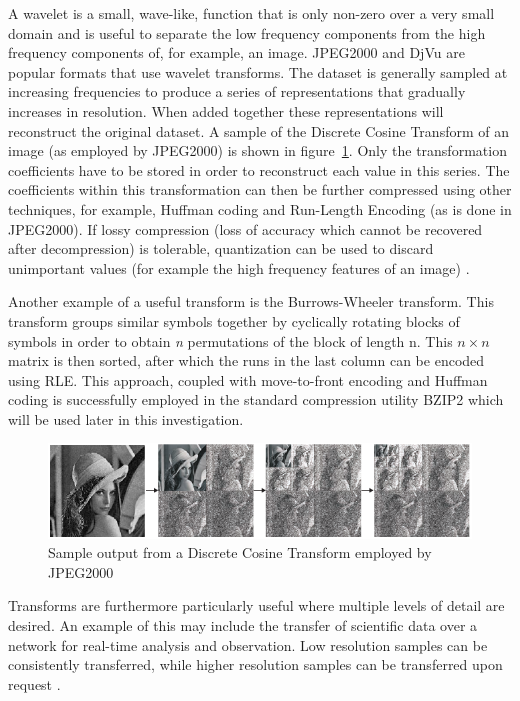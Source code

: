 A wavelet is a small, wave-like, function that is only non-zero over a very small domain and is useful to separate the low frequency components from the high frequency components of, 
for example, an image. JPEG2000 and DjVu are popular formats that use wavelet transforms. The dataset is generally sampled at increasing frequencies to produce a series of representations 
that gradually increases in resolution. When added together these representations will reconstruct the original dataset. A sample of the Discrete Cosine Transform of an image (as employed by JPEG2000) 
is shown in figure~\ref{TRANSFORM_SAMPLE}. Only the transformation coefficients have to be stored in order to reconstruct each value in this series. The coefficients within this transformation 
can then be further compressed using other techniques, for example, Huffman coding and Run-Length Encoding (as is done in JPEG2000). If lossy compression (loss of accuracy which cannot be recovered after 
decompression) is tolerable, quantization can be used to discard unimportant values (for example the high frequency features of an image) \cite{952804}\cite[ch. 5]{salomon2004data}.

Another example of a useful transform is the Burrows-Wheeler transform. This transform groups similar symbols together by cyclically rotating blocks of symbols in order to 
obtain \textit{n} permutations of the block of length n. This $n\times n$ matrix is then sorted, after which the runs in the last column can be encoded using RLE. This approach, coupled
with move-to-front encoding and Huffman coding is successfully employed in the standard compression utility BZIP2 which will be used later in this investigation\cite[ch. 8]{salomon2004data}\cite{seward1996bzip2}.
\begin{figure}[h!]
\begin{mdframed}
 \centering
 \includegraphics[width=1.0\textwidth]{DCTSample.png}
 \caption{Sample output from a Discrete Cosine Transform employed by JPEG2000 \cite{952804}}
 \label{TRANSFORM_SAMPLE}
\end{mdframed}
\end{figure}

Transforms are furthermore particularly useful where multiple levels of detail are desired. An example of this may include the transfer of scientific data over a network 
for real-time analysis and observation. Low resolution samples can be consistently transferred, while higher resolution samples can be transferred upon request \cite{Tao:1994:PTS:951087.951108}.
